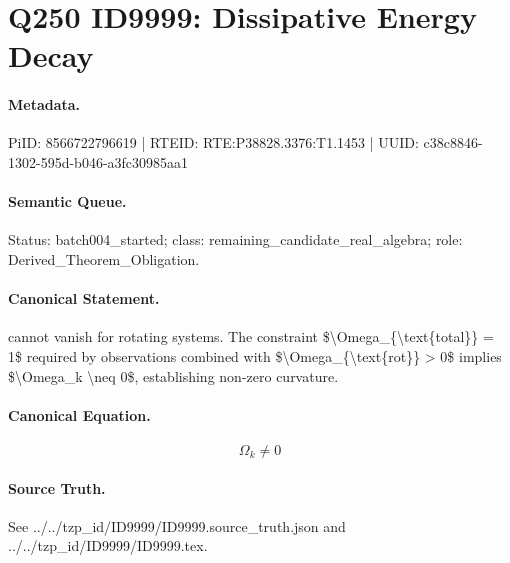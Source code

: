 \section*{Q250 ID9999: Dissipative Energy Decay}
\paragraph{Metadata.}
PiID: 8566722796619 | RTEID: RTE:P38828.3376:T1.1453 | UUID: c38c8846-1302-595d-b046-a3fc30985aa1

\paragraph{Semantic Queue.}
Status: batch004\_started; class: remaining\_candidate\_real\_algebra; role: Derived\_Theorem\_Obligation.

\paragraph{Canonical Statement.}
cannot vanish for rotating systems. The constraint \$\textbackslash{}Omega\_\{\textbackslash{}text\{total\}\} = 1\$ required by observations combined with \$\textbackslash{}Omega\_\{\textbackslash{}text\{rot\}\} > 0\$ implies \$\textbackslash{}Omega\_k \textbackslash{}neq 0\$, establishing non-zero curvature.

\paragraph{Canonical Equation.}
\[
\Omega_k \neq 0
\]

\paragraph{Source Truth.}
See ../../tzp\_id/ID9999/ID9999.source\_truth.json and ../../tzp\_id/ID9999/ID9999.tex.
